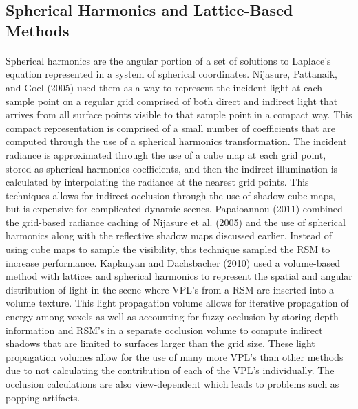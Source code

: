 \subsection{Spherical Harmonics and Lattice-Based Methods}
\paragraph{}
Spherical harmonics are the angular portion of a set of solutions to Laplace's equation represented in a system of spherical coordinates.  Nijasure, Pattanaik, and Goel (2005) used them as a way to represent the incident light at each sample point on a regular grid comprised of both direct and indirect light that arrives from all surface points visible to that sample point in a compact way.  This compact representation is comprised of a small number of coefficients that are computed through the use of a spherical harmonics transformation.  The incident radiance is approximated through the use of a cube map at each grid point, stored as spherical harmonics coefficients, and then the indirect illumination is calculated by interpolating the radiance at the nearest grid points.  This techniques allows for indirect occlusion through the use of shadow cube maps, but is expensive for complicated dynamic scenes.  Papaioannou (2011) combined the grid-based radiance caching of Nijasure et al. (2005) and the use of spherical harmonics along with the reflective shadow maps discussed earlier.  Instead of using cube maps to sample the visibility, this technique sampled the RSM to increase performance.  Kaplanyan and Dachsbacher (2010) used a volume-based method with lattices and spherical harmonics to represent the spatial and angular distribution of light in the scene where VPL's from a RSM are inserted into a volume texture.  This light propagation volume allows for iterative propagation of energy among voxels as well as accounting for fuzzy occlusion by storing depth information and RSM's in a separate occlusion volume to compute indirect shadows that are limited to surfaces larger than the grid size.  These light propagation volumes allow for the use of many more VPL's than other methods due to not calculating the contribution of each of the VPL's individually.  The occlusion calculations are also view-dependent which leads to problems such as popping artifacts.
